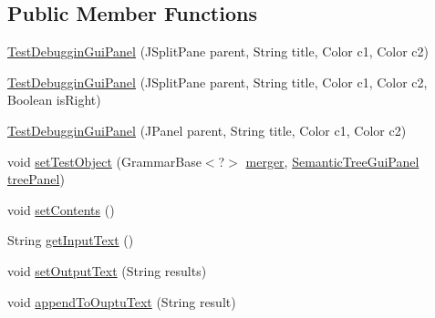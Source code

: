 \subsection*{Public Member Functions}
\begin{DoxyCompactItemize}
\item 
\hyperlink{classit_1_1emarolab_1_1cagg_1_1debugging_1_1baseComponents_1_1customPanel_1_1TestDebugginGuiPanel_aca263fd3c64c1fca36521c06a198c10f}{Test\-Debuggin\-Gui\-Panel} (J\-Split\-Pane parent, String title, Color c1, Color c2)
\item 
\hyperlink{classit_1_1emarolab_1_1cagg_1_1debugging_1_1baseComponents_1_1customPanel_1_1TestDebugginGuiPanel_abe57f79116d8b7cdd2150459591242bf}{Test\-Debuggin\-Gui\-Panel} (J\-Split\-Pane parent, String title, Color c1, Color c2, Boolean is\-Right)
\item 
\hyperlink{classit_1_1emarolab_1_1cagg_1_1debugging_1_1baseComponents_1_1customPanel_1_1TestDebugginGuiPanel_af7b2a07db0d1f381fe3a94b27aba9035}{Test\-Debuggin\-Gui\-Panel} (J\-Panel parent, String title, Color c1, Color c2)
\item 
void \hyperlink{classit_1_1emarolab_1_1cagg_1_1debugging_1_1baseComponents_1_1customPanel_1_1TestDebugginGuiPanel_aec81bd599070cd1ef65c3a29e231d1d2}{set\-Test\-Object} (Grammar\-Base$<$?$>$ \hyperlink{classit_1_1emarolab_1_1cagg_1_1debugging_1_1baseComponents_1_1customPanel_1_1TestDebugginGuiPanel_a59be25211fda834109470e630af66346}{merger}, \hyperlink{classit_1_1emarolab_1_1cagg_1_1debugging_1_1baseComponents_1_1customPanel_1_1SemanticTreeGuiPanel}{Semantic\-Tree\-Gui\-Panel} \hyperlink{classit_1_1emarolab_1_1cagg_1_1debugging_1_1baseComponents_1_1customPanel_1_1TestDebugginGuiPanel_aa6da15d3e740440a5825086412761edd}{tree\-Panel})
\item 
void \hyperlink{classit_1_1emarolab_1_1cagg_1_1debugging_1_1baseComponents_1_1customPanel_1_1TestDebugginGuiPanel_a9bd139b6ceb6e86b70c71671b99b8396}{set\-Contents} ()
\item 
String \hyperlink{classit_1_1emarolab_1_1cagg_1_1debugging_1_1baseComponents_1_1customPanel_1_1TestDebugginGuiPanel_a74b0178382d13fda589abded448f988c}{get\-Input\-Text} ()
\item 
void \hyperlink{classit_1_1emarolab_1_1cagg_1_1debugging_1_1baseComponents_1_1customPanel_1_1TestDebugginGuiPanel_a91113a17f2836d69924f73863424af77}{set\-Output\-Text} (String results)
\item 
void \hyperlink{classit_1_1emarolab_1_1cagg_1_1debugging_1_1baseComponents_1_1customPanel_1_1TestDebugginGuiPanel_a7d3c1bc3fe1fd15cb60db78a0aa4c3a8}{append\-To\-Ouptu\-Text} (String result)

\end{DoxyCompactItemize}
